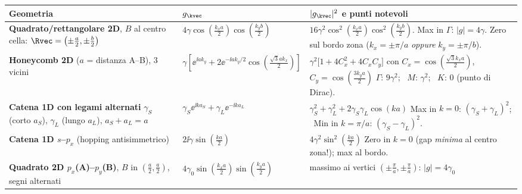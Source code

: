 \begin{center}
\renewcommand{\arraystretch}{1.8}
{\small
\begin{tabular}{p{5.2cm} p{5.4cm} p{5.4cm}}
\toprule
\textbf{Geometria} & $g_\kvec$ & $|g_\kvec|^2$ e punti notevoli \\
\midrule
\textbf{Quadrato/rettangolare 2D}, $B$ al centro cella: $\Rvec=\left(\pm\frac a2,\pm\frac b2\right)$
& $4\gamma\cos\!\left(\frac{k_xa}{2}\right)\cos\!\left(\frac{k_yb}{2}\right)$
& $16\gamma^2\cos^2\!\left(\frac{k_xa}{2}\right)\cos^2\!\left(\frac{k_yb}{2}\right)$. \newline
  Max in $\Gamma$: $|g|=4\gamma$. \newline Zero sul bordo zona ($k_x=\pm\pi/a$ \emph{oppure} $k_y=\pm\pi/b$). \\
\textbf{Honeycomb 2D} ($a$ = distanza A--B), 3 vicini
& $\gamma\left[\ee^{\ii a k_y}\!+2\ee^{-\ii a k_y/2}\cos\!\left(\frac{\sqrt3 ak_x}{2}\right)\right]$
& $\gamma^2\big[1+4C_x^2+4C_xC_y\big]$ \newline con $C_x=\cos\!\left(\frac{\sqrt3k_xa}{2}\right)$, $C_y=\cos\!\left(\frac{3k_ya}{2}\right)$ \newline
  $\Gamma$: $9\gamma^2$; \ $M$: $\gamma^2$; \ $K$: $0$ (punto di Dirac). \\
\textbf{Catena 1D con legami alternati} $\gamma_S$ (corto $a_S$), $\gamma_L$ (lungo $a_L$), $a_S+a_L=a$
& $\gamma_S\ee^{\ii k a_S} + \gamma_L\ee^{-\ii k a_L}$
& $\gamma_S^2+\gamma_L^2+2\gamma_S\gamma_L\cos(ka)$ \newline
  Max in $k=0$: $(\gamma_S+\gamma_L)^2$; \ Min in $k=\pi/a$: $(\gamma_S-\gamma_L)^2$. \\
\textbf{Catena 1D $s$--$p_x$} (hopping antisimmetrico)
& $2\ii\gamma\sin\!\left(\frac{ka}{2}\right)$
& $4\gamma^2\sin^2\!\left(\frac{ka}{2}\right)$ \newline
  Zero in $k=0$ (gap \emph{minima} al centro zona!); max al bordo. \\
\textbf{Quadrato 2D $p_x$(A)--$p_y$(B)}, $B$ in $\left(\frac a2,\frac a2\right)$, segni alternati
& $4\gamma_0\sin\!\left(\frac{k_xa}{2}\right)\sin\!\left(\frac{k_ya}{2}\right)$
& massimo ai vertici $\left(\pm\frac\pi a,\pm\frac\pi a\right)$: $|g|=4\gamma_0$ \\
\bottomrule
\end{tabular}}
\end{center}

